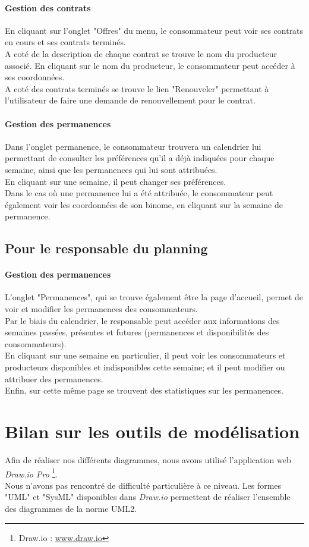 \documentclass[12pt]{report}
\begin{document}
\paragraph{Gestion des contrats}
En cliquant sur l'onglet "Offres" du menu, le consommateur peut voir ses contrats en cours et ses contrats terminés. \\
A coté de la description de chaque contrat se trouve le nom du producteur associé. En cliquant sur le nom du producteur, le consommateur peut accéder à ses coordonnées.\\

A coté des contrats terminés se trouve le lien "Renouveler" permettant à l'utilisateur de faire une demande de renouvellement pour le contrat.

\paragraph{Gestion des permanences}
Dans l'onglet permanence, le consommateur trouvera un calendrier lui permettant de consulter les préférences qu'il a déjà indiquées pour chaque semaine, ainsi que les permanences qui lui sont attribuées.\\
En cliquant sur une semaine, il peut changer ses préférences. \\
Dans le cas où une permanence lui a été attribuée, le consommateur peut également voir les coordonnées de son binome, en cliquant sur la semaine de permanence.

\subsection{Pour le responsable du planning}
\paragraph{Gestion des permanences}
L'onglet "Permanences", qui se trouve également être la page d'accueil, permet de voir et modifier les permanences des consommateurs.\\
Par le biais du calendrier, le responsable peut accéder aux informations des semaines passées, présentes et futures (permanences et disponibilités des consommateurs).\\
En cliquant sur une semaine en particulier, il peut voir les consommateurs et producteurs disponibles et indisponibles cette semaine; et il peut modifier ou attribuer des permanences.\\

Enfin, sur cette même page se trouvent des statistiques sur les permanences.

\clearpage
\section{Bilan sur les outils de modélisation}
Afin de réaliser nos différents diagrammes, nous avons utilisé l'application web \textit{Draw.io Pro} \footnote{Draw.io : \url{www.draw.io}}.\\
Nous n'avons pas rencontré de difficulté particulière à ce niveau. Les formes "UML" et "SysML" disponibles dans \textit{Draw.io} permettent de réaliser l'ensemble des diagrammes de la norme UML2.
\end{document}
